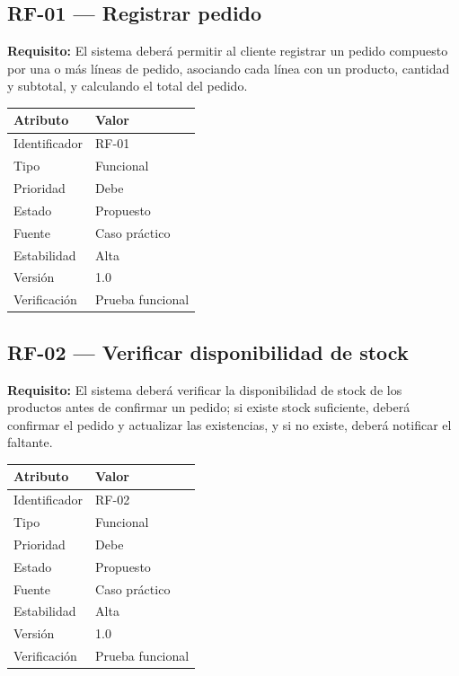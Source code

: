 \documentclass[12pt,a4paper]{article}
\begin{document}
\subsection*{RF-01 --- Registrar pedido}

\textbf{Requisito:} El sistema deberá permitir al cliente registrar un pedido compuesto por una o más líneas de pedido, asociando cada línea con un producto, cantidad y subtotal, y calculando el total del pedido.

\begin{center}
\begin{tabular}{ll}
\toprule
\textbf{Atributo} & \textbf{Valor} \\
\midrule
Identificador & RF-01 \\
Tipo & Funcional \\
Prioridad & Debe \\
Estado & Propuesto \\
Fuente & Caso práctico \\
Estabilidad & Alta \\
Versión & 1.0 \\
Verificación & Prueba funcional \\
\bottomrule
\end{tabular}
\end{center}

\subsection*{RF-02 --- Verificar disponibilidad de stock}

\textbf{Requisito:} El sistema deberá verificar la disponibilidad de stock de los productos antes de confirmar un pedido; si existe stock suficiente, deberá confirmar el pedido y actualizar las existencias, y si no existe, deberá notificar el faltante.

\begin{center}
\begin{tabular}{ll}
\toprule
\textbf{Atributo} & \textbf{Valor} \\
\midrule
Identificador & RF-02 \\
Tipo & Funcional \\
Prioridad & Debe \\
Estado & Propuesto \\
Fuente & Caso práctico \\
Estabilidad & Alta \\
Versión & 1.0 \\
Verificación & Prueba funcional \\
\bottomrule
\end{tabular}
\end{center}
\end{document}
